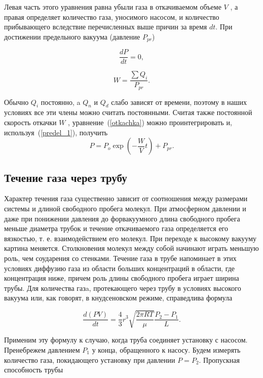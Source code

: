 \documentclass[a4paper,12pt]{article} %
\begin{document}
Левая часть этого уравнения равна убыли газа в откачиваемом объеме $V$ , а правая определяет количество газа, уносимого насосом, и количество прибывающего вследствие перечисленных выше причин
за время $dt$. При достижении предельного вакуума (давление $P_{pr}$)

\begin{equation}
\label{predel_1}
	\frac{dP}{dt}=0,
\end{equation}

\begin{equation}
\label{predel_2}
	W=\frac{\sum Q_i}{P_{pr}}.
\end{equation}

Обычно $Q_i$ постоянно, a $Q_n$ и $Q_d$ слабо зависят от времени, поэтому в наших условиях все эти члены можно считать постоянными. Считая также постоянной скорость откачки $W$ , уравнение~(\ref{otkachka}) можно проинтегрировать и, используя~(\ref{predel_1}), получить
\begin{equation}
\label{pressure}
	P = P_o \exp{(-\frac{W}{V} t)} + P_{pr}.
\end{equation}

\subsection*{Течение газа через трубу}

Характер течения газа существенно зависит от соотношения между размерами системы и длиной свободного пробега молекул. При атмосферном давлении и даже при понижении давления до форвакуумного длина свободного пробега меньше диаметра трубок и течение откачиваемого газа определяется его вязкостью, т. е. взаимодействием его молекул. При переходе к высокому вакууму картина меняется. Столкновения молекул между собой начинают играть меньшую роль, чем соударения со стенками. Течение газа в трубе напоминает в этих условиях диффузию газа из области больших концентраций в области, где концентрация ниже, причем роль длины свободного пробега играет ширина трубы.
Для количества газa, протекающего через трубу в условиях высокого вакуума или, как говорят, в кнудсеновском режиме, справедлива формула

\begin{equation}
\label{flow1}
	\frac{d(PV)}{dt}=\frac{4}{3}r^3 \sqrt{\frac{2\pi RT}{\mu}} \frac{P_2-P_1}{L}.
\end{equation}

Применим эту формулу к случаю, когда труба соединяет установку с насосом.
Пренебрежем давлением $P_1$ у конца, обращенного к насосу. Будем измерять количество газа, покидающего установку при давлении $P = P_2$. Пропускная способность трубы
\end{document}
